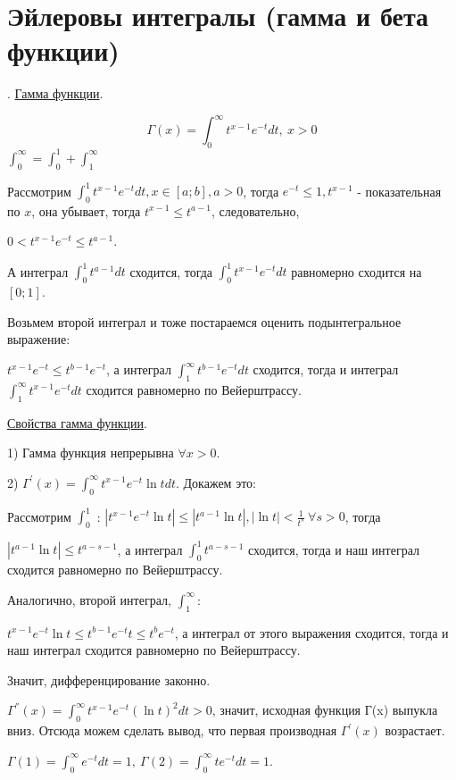 \documentclass[12pt]{article}
\begin{document}
\section{Эйлеровы интегралы (гамма и бета функции)}
. \uline{Гамма функции}.\par
$$\Gamma (x) = \int_0^{\infty} t^{x-1} e^{-t} dt, \ x>0$$
$\int_0^{\infty} = \int_0^1 + \int_1^\infty$\par
Рассмотрим $\int_0^1 t^{x-1} e^{-t} dt, x\in [a;b], a > 0$, тогда $e^{-t} \leq 1, t^{x-1}$ - показательная по $x$, она убывает, тогда $t^{x-1} \leq t^{a-1}$, следовательно,\par
$0 < t^{x-1} e^{-t} \leq t^{a-1}$.\par
А интеграл $\int_0^1 t^{a-1} dt$ сходится, тогда $\int_0^1 t^{x-1} e^{-t} dt$ равномерно сходится на $[0;1]$.\par
Возьмем второй интеграл и тоже постараемся оценить подынтегральное выражение:\par
$t^{x-1}e^{-t} \leq t^{b-1} e^{-t}$, а интеграл $\int_1^{\infty} t^{b-1} e^{-t} dt$ сходится, тогда и интеграл $\int_1^{\infty} t^{x-1} e^{-t} dt$ сходится равномерно по Вейерштрассу.\par
\uline{Свойства гамма функции}.\par
1) Гамма функция непрерывна $\forall x > 0$.\par
2) $\Gamma^{'} (x) = \int_0^{\infty} t^{x-1} e^{-t} \ln{t} dt$. Докажем это:\par
Рассмотрим $\int_0^1$ : $|t^{x-1} e^{-t} \ln{t}| \leq |t^{a-1} \ln{t}|, |\ln{t}| < \frac{1}{t^s} \ \forall s > 0$, тогда\par
$|t^{a-1} \ln{t} | \leq t^{a-s-1}$, а интеграл $\int_0^1 t^{a-s-1}$ сходится, тогда и наш интеграл сходится равномерно по Вейерштрассу.\par
Аналогично, второй интеграл, $\int_1^{\infty}$:\par
$t^{x-1} e^{-t} \ln{t} \leq t^{b-1} e^{-t} t \leq t^{b} e^{-t}$, а интеграл от этого выражения сходится, тогда и наш интеграл сходится равномерно по Вейерштрассу.\par
Значит, дифференцирование законно.\par
$\Gamma^{''}(x) = \int_0^{\infty} t^{x-1} e^{-t} (\ln{t})^2 dt > 0$, значит, исходная функция Г(x) выпукла вниз. Отсюда можем сделать вывод, что первая производная $\Gamma^{'} (x)$ возрастает.\par
$\Gamma(1) = \int_0^{\infty} e^{-t} dt = 1, \ \Gamma(2) = \int_0^\infty t e^{-t} dt = 1$.\par
\end{document}
